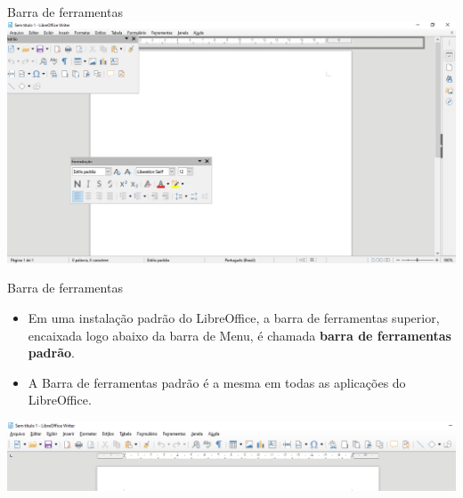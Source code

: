 \begin{frame}{Barra de ferramentas}
	\centering
	\includegraphics[width=1\linewidth]{Figuras/Ch04/fig8}
\end{frame}


\begin{frame}{Barra de ferramentas}
	\begin{block}{}
		\begin{itemize}
			\item Em uma instalação padrão do LibreOffice, a barra de ferramentas superior, encaixada logo abaixo da barra de Menu, é chamada \textbf{barra de ferramentas padrão}.
			\item A Barra de ferramentas padrão é a mesma em todas as aplicações do LibreOffice.
		\end{itemize}
	\end{block}

	\bigskip

	\centering
	\includegraphics[width=1\linewidth]{Figuras/Ch04/fig9}
\end{frame}


